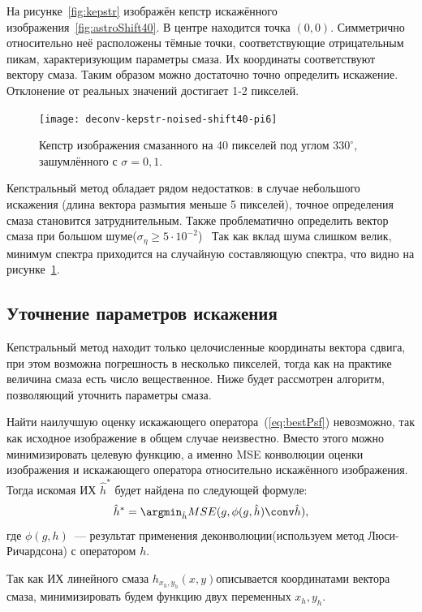 На рисунке~\ref{fig:kepstr} изображён кепстр искажённого изображения~\ref{fig:astroShift40}. В центре находится точка $(0,0)$. Симметрично относительно неё расположены тёмные точки, соответствующие отрицательным пикам, характеризующим параметры смаза. Их координаты соответствуют вектору смаза. Таким образом можно достаточно точно определить искажение. Отклонение от реальных значений достигает 1-2 пикселей.

\begin{figure}[h!]
	\centerline{\texttt{[image: deconv-kepstr-noised-shift40-pi6]}}
	\caption{Кепстр изображения смазанного на 40 пикселей под углом $330^{\circ}$, зашумлённого с $\sigma=0,1$.}
	\label{fig:kepstrNoised}
\end{figure}
Кепстральный метод обладает рядом недостатков: в случае небольшого искажения (длина вектора размытия меньше 5 пикселей), точное определения смаза становится затруднительным. Также проблематично определить вектор смаза при большом шуме($\sigma_\eta \geq 5\cdot 10^{-2}$)~\cite{panfilovaThesis} Так как вклад шума слишком велик, минимум спектра приходится на случайную составляющую спектра, что видно на рисунке~\ref{fig:kepstrNoised}.

\subsection{Уточнение параметров искажения}
Кепстральный метод находит только целочисленные координаты вектора сдвига, при этом возможна погрешность в несколько пикселей, тогда как на практике величина смаза есть число вещественное. Ниже будет рассмотрен алгоритм, позволяющий уточнить параметры смаза.

Найти наилучшую оценку искажающего оператора~(\ref{eq:bestPsf}) невозможно, так как исходное изображение в общем случае неизвестно. Вместо этого можно минимизировать целевую функцию, а именно MSE конволюции оценки изображения и искажающего оператора относительно искажённого изображения. Тогда искомая ИХ $\hat{h}^*$ будет найдена по следующей формуле:
\begin{equation}\label{eq:bestPsfModified}
\hat{h}^* = \argmin_{\hat{h}} MSE(g, \phi(g,\hat{h}) \conv \hat{h}),
\end{equation}
где $\phi(g, h)$~--- результат применения деконволюции(используем метод Люси-Ричардсона) с оператором $h$.

Так как ИХ линейного смаза $h_{x_h,y_h}(x,y)$описывается координатами вектора смаза, минимизировать будем функцию двух переменных $x_h, y_h$.

